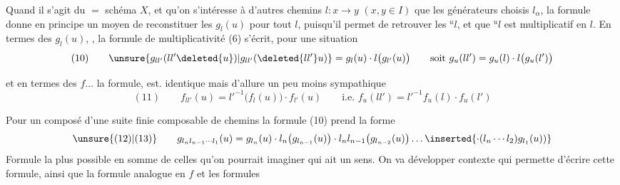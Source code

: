 Quand il s'agit du $=$ schéma $X$, et qu'on s'intéresse à d'autres chemins $l:x\longrightarrow y$ $(x,y\in I)$ que les générateurs choisis $l_\alpha$, la formule donne en principe un moyen de reconstituer les $g_l(u)$ pour tout $l$, puisqu'il permet de retrouver les ${}^u l$, et que ${}^u l$ est multiplicatif en $l$. En termes des $g_l(u)$, , la formule de multiplicativité (6) s'écrit, pour une situation
\[
(10)\qquad \unsure{g_{ll'}(ll'\deleted{u})|g_{ll'}(\deleted{ll'}u)}=g_l(u)\cdot l\bigl(g_{l'}(u)\bigr)
\qquad\text{soit }g_u(ll')=g_u(l)\cdot l\bigl(g_u(l')\bigr)
\]

et en termes des $f\ldots$ la formule, est. identique mais d'allure un peu moins sympathique
\[
(11)\qquad f_{ll'}(u)=l'^{-1}\bigl(f_l(u)\bigr)\cdot f_{l'}(u)
\qquad\text{i.e. }f_u(ll')=l'^{-1}f_u(l)\cdot f_u(l')
\]


Pour un composé d'une  suite finie composable de chemins
la formule (10) prend la forme
\[
\unsure{(12)|(13)}\qquad
 g_{l_nl_{n-1}\cdots l_1}(u)=g_{l_n}(u)\cdot l_n\bigl(g_{l_{n-1}}(u)\bigr)\cdot l_nl_{n-1}\bigl(g_{l_{n-2}}(u)\bigr)\ldots
 \inserted{\cdot(l_n\cdots l_2)g_{l_1}(u))}
\]
Formule la plus   possible en somme de celles qu'on pourrait imaginer qui ait un sens. On va développer   contexte qui permette  d'écrire cette formule, ainsi que  la formule analogue en $f$ et les formules

